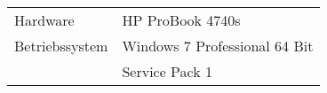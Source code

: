 
\begin{table}[h!]
\centering
\begin{tabular}{ l l }
Hardware        & HP ProBook 4740s \\
Betriebssystem  & Windows 7 Professional 64 Bit \\
                & Service Pack 1 \\
\end{tabular}
\end{table}

